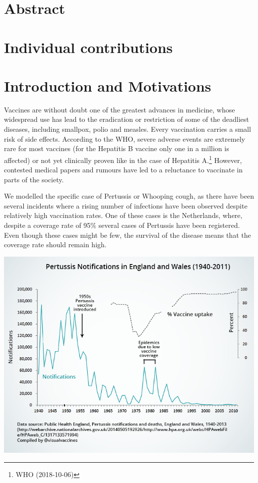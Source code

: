 \documentclass[11pt]{article}
\begin{document}

\tableofcontents

\newpage




\section{Abstract}



\section{Individual contributions}

\section{Introduction and Motivations}

Vaccines are without doubt one of the greatest advances in medicine, whose widespread use has lead to the eradication or restriction of some of the deadliest diseases, including smallpox, polio and measles. Every vaccination carries a small risk of side effects. According to the WHO, severe adverse events are extremely rare for most vaccines (for the Hepatitis B vaccine only one in a million is affected) or not yet clinically proven like in the case of Hepatitis A.\footnote{WHO (2018-10-06)}  However, contested medical papers and rumours have led to a reluctance to vaccinate in parts of the society.

\vspace{14px}

We modelled the specific case of Pertussis or Whooping cough, as there have been several incidents where a rising number of infections have been observed despite relatively high vaccination rates. One of these cases is the Netherlands, where, despite a coverage rate of 95\% several cases of Pertussis have been registered. Even though these cases might be few, the survival of the disease means that the coverage rate should remain high. 

\includegraphics[scale=0.6]{ukpertussis}
\end{document}
